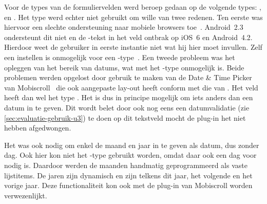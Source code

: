 Voor de types van de formuliervelden werd beroep gedaan op de volgende types: ,  en . 
Het  type werd echter niet gebruikt om wille van twee redenen.
Ten eerste was hiervoor een slechte ondersteuning naar mobiele browsers toe~\cite{Deveria2013b}.
Android~2.3 ondersteunt dit niet en de -tekst in het veld ontbrak op iOS~6 en Android~4.2.
Hierdoor weet de gebruiker in eerste instantie niet wat hij hier moet invullen. 
Zelf een  instellen is onmogelijk voor een -type~\cite{Berjon2012}. 
Een tweede probleem was het opleggen van het bereik van datums, wat met het -type onmogelijk is. 
Beide problemen werden opgelost door gebruik te maken van de Date \& Time Picker van Mobiscroll~\cite{Mobiscroll2013} die ook aangepaste lay-out heeft conform met die van \jqm{}. 
Het veld heeft dan wel het type .
Het is dus in principe mogelijk om iets anders dan een datum in te geven. 
Dit wordt belet door ook nog eens een datumvalidatie (zie \ref{sec:evaluatie-gebruik-u3}) te doen op dit tekstveld mocht de plug-in het niet hebben afgedwongen.
 
Het was ook nodig om enkel de maand en jaar in te geven als datum, dus zonder dag.
Ook hier kon niet het -type gebruikt worden, omdat daar ook een dag voor nodig is. 
Daardoor werden de maanden handmatig geprogrammeerd als vaste lijstitems. 
De jaren zijn dynamisch en zijn telkens dit jaar, het volgende en het vorige jaar. 
Deze functionaliteit kon ook met de plug-in van Mobiscroll worden verwezenlijkt.

